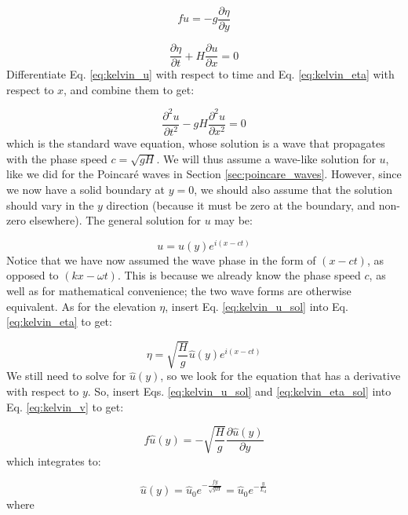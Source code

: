 \documentclass[12pt]{article}
\numberwithin{equation}{section}
\numberwithin{figure}{section}
\numberwithin{table}{section}
\begin{document}
\begin{equation}
  f u = - g \frac{\partial \eta}{\partial y}
  \label{eq:kelvin_v}
\end{equation}

\begin{equation}
  \frac{\partial \eta}{\partial t} + H \frac{\partial u}{\partial x} = 0
  \label{eq:kelvin_eta}
\end{equation}
Differentiate Eq. \ref{eq:kelvin_u} with respect to time and Eq. \ref{eq:kelvin_eta}
with respect to $x$, and combine them to get:

\begin{equation}
  \frac{\partial^2 u}{\partial t^2} - gH \frac{\partial^2 u}{\partial x^2} = 0
\end{equation}
which is the standard wave equation, whose solution is a wave that propagates
with the phase speed $c = \sqrt{gH}$.
We will thus assume a wave-like solution for $u$, like we did for the Poincaré
waves in Section \ref{sec:poincare_waves}.
However, since we now have a solid boundary at $y = 0$, we should also assume
that the solution should vary in the $y$ direction (because it must be zero
at the boundary, and non-zero elsewhere).
The general solution for $u$ may be:

\begin{equation}
  u = \widehat{u}(y) e^{i(x - c t)}
  \label{eq:kelvin_u_sol}
\end{equation}
Notice that we have now assumed the wave phase in the form of $(x - c t)$,
as opposed to $(kx - \omega t)$.
This is because we already know the phase speed $c$, as well as for mathematical
convenience; the two wave forms are otherwise equivalent.
As for the elevation $\eta$, insert Eq. \ref{eq:kelvin_u_sol} into Eq.
\ref{eq:kelvin_eta} to get:

\begin{equation}
  \eta = \sqrt{\frac{H}{g}} \widehat{u}(y) e^{i(x - c t)}
  \label{eq:kelvin_eta_sol}
\end{equation}
We still need to solve for $\widehat{u}(y)$, so we look for the equation that
has a derivative with respect to $y$.
So, insert Eqs. \ref{eq:kelvin_u_sol} and \ref{eq:kelvin_eta_sol} into Eq.
\ref{eq:kelvin_v} to get:

\begin{equation}
  f \widehat{u}(y) = - \sqrt{\frac{H}{g}} \frac{\partial \widehat{u}(y)}{\partial y}
\end{equation}
which integrates to:

\begin{equation}
  \widehat{u}(y) =
  \widehat{u}_0 e^{-\frac{fy}{\sqrt{gH}}} =
  \widehat{u}_0 e^{-\frac{y}{L_d}}
  \label{eq:kelvin_u_sol_y}
\end{equation}
where
\end{document}
